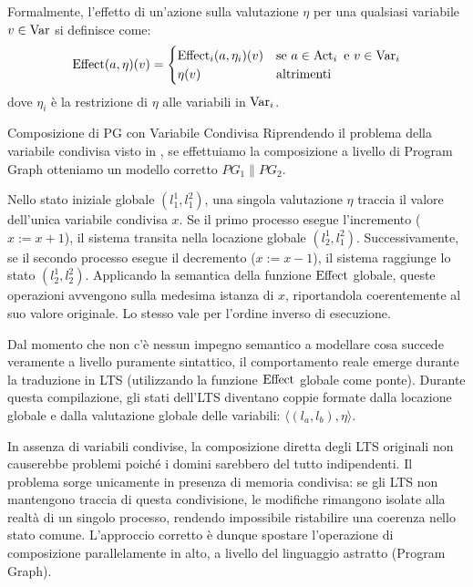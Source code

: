 Formalmente, l'effetto di un'azione sulla valutazione \(\eta\) per una qualsiasi variabile \(v \in \operatorname{Var}\) si definisce come:
\[
  \operatorname{Effect}(a, \eta)(v) =
  \begin{cases}
    \operatorname{Effect}_i(a, \eta_i)(v) & \text{se } a \in \operatorname{Act}_i \text{ e } v \in \operatorname{Var}_i \\
    \eta(v)              & \text{altrimenti}
  \end{cases}
\]
dove \(\eta_i\) è la restrizione di \(\eta\) alle variabili in \(\operatorname{Var}_i\).


\begin{example}{Composizione di PG con Variabile Condivisa}
  Riprendendo il problema della variabile condivisa visto in , se effettuiamo la composizione a livello di Program Graph otteniamo un modello corretto \(PG_1 \parallel PG_2\).

  Nello stato iniziale globale \((l_1^1, l_1^2)\), una singola valutazione \(\eta\) traccia il valore dell'unica variabile condivisa \(x\).
  Se il primo processo esegue l'incremento (\(x := x+1\)), il sistema transita nella locazione globale \((l_2^1, l_1^2)\). Successivamente, se il secondo processo esegue il decremento (\(x := x-1\)), il sistema raggiunge lo stato \((l_2^1, l_2^2)\). Applicando la semantica della funzione \(\operatorname{Effect}\) globale, queste operazioni avvengono sulla medesima istanza di \(x\), riportandola coerentemente al suo valore originale. Lo stesso vale per l'ordine inverso di esecuzione.
\end{example}

Dal momento che non c'è nessun impegno semantico a modellare cosa succede veramente a livello puramente sintattico, il comportamento reale emerge durante la traduzione in LTS (utilizzando la funzione \(\operatorname{Effect}\) globale come ponte).
Durante questa compilazione, gli stati dell'LTS diventano coppie formate dalla locazione globale e dalla valutazione globale delle variabili: \(\langle (l_a, l_b), \eta \rangle\).

In assenza di variabili condivise, la composizione diretta degli LTS originali non causerebbe problemi poiché i domini sarebbero del tutto indipendenti. Il problema sorge unicamente in presenza di memoria condivisa: se gli LTS non mantengono traccia di questa condivisione, le modifiche rimangono isolate alla realtà di un singolo processo, rendendo impossibile ristabilire una coerenza nello stato comune. L'approccio corretto è dunque spostare l'operazione di composizione parallelamente in alto, a livello del linguaggio astratto (Program Graph).


